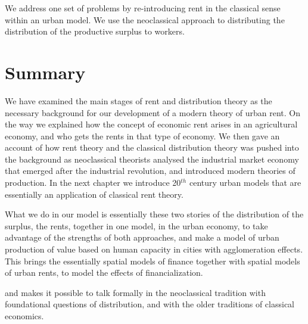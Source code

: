 We address one set of problems by re-introducing rent in the classical sense within an urban model. 
We  use the neoclassical approach to distributing the distribution of the productive surplus to workers.
 
\section{Summary}



We have examined the main stages of rent and distribution theory
as the necessary background for our development %
of a modern theory of urban rent. On the way we explained how the concept of economic rent arises in an agricultural economy, and who gets the rents in that type of economy. We then gave an account of how rent theory and the classical distribution theory was pushed into the background as neoclassical theorists analysed the industrial market economy that emerged after the industrial revolution, and introduced modern theories of production. In the next chapter we introduce 20$^{th}$ century urban models that are essentially an application of classical rent theory.


What we do in our  model is essentially these two stories of the distribution of the surplus, the rents, together in one model, in the urban economy, to take advantage of the strengths of both approaches, and make a model of %
urban production of value based on human capacity in cities with agglomeration effects. 
This brings the essentially spatial models of finance together with spatial models of urban rents, to model the effects of financialization. 

and makes it possible to talk formally in the neoclassical tradition with foundational questions of distribution, and with the older traditions of classical economics. 




